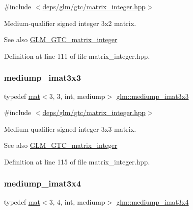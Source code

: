 {\ttfamily \#include $<$\hyperlink{matrix__integer_8hpp}{deps/glm/gtc/matrix\+\_\+integer.\+hpp}$>$}

Medium-\/qualifier signed integer 3x2 matrix. \begin{DoxySeeAlso}{See also}
\hyperlink{group__gtc__matrix__integer}{G\+L\+M\+\_\+\+G\+T\+C\+\_\+matrix\+\_\+integer} 
\end{DoxySeeAlso}


Definition at line 111 of file matrix\+\_\+integer.\+hpp.

\mbox{\label{group__gtc__matrix__integer_ga1304a2da9c3f5937aa8c4684d638d09c}} 
\subsubsection{\texorpdfstring{mediump\+\_\+imat3x3}{mediump\_imat3x3}}
{\footnotesize\ttfamily typedef \hyperlink{structglm_1_1mat}{mat}$<$3, 3, int, mediump$>$ \hyperlink{group__gtc__matrix__integer_ga1304a2da9c3f5937aa8c4684d638d09c}{glm\+::mediump\+\_\+imat3x3}}



{\ttfamily \#include $<$\hyperlink{matrix__integer_8hpp}{deps/glm/gtc/matrix\+\_\+integer.\+hpp}$>$}

Medium-\/qualifier signed integer 3x3 matrix. \begin{DoxySeeAlso}{See also}
\hyperlink{group__gtc__matrix__integer}{G\+L\+M\+\_\+\+G\+T\+C\+\_\+matrix\+\_\+integer} 
\end{DoxySeeAlso}


Definition at line 115 of file matrix\+\_\+integer.\+hpp.

\mbox{\label{group__gtc__matrix__integer_gae0ab87609ac842f31be9e581caafa0f0}} 
\subsubsection{\texorpdfstring{mediump\+\_\+imat3x4}{mediump\_imat3x4}}
{\footnotesize\ttfamily typedef \hyperlink{structglm_1_1mat}{mat}$<$3, 4, int, mediump$>$ \hyperlink{group__gtc__matrix__integer_gae0ab87609ac842f31be9e581caafa0f0}{glm\+::mediump\+\_\+imat3x4}}



